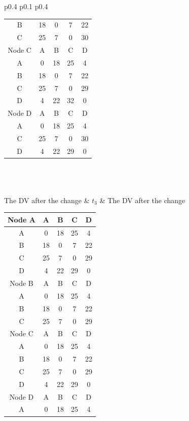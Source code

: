 \documentclass{article}
\begin{document}
\begin{tabular}{p{0.4\linewidth} p{0.1\linewidth} p{0.4\linewidth}}
\begin{tabular}{c|c|c|c|c}
        B & 18 & 0 & 7 & 22 \\
        C & 25 & 7 & 0 & 30 \\
        \hline
        \hline
        Node C & A & B & C & D \\
        \hline
        A & 0 & 18 & 25 & 4 \\
        B & 18 & 0 & 7 & 22 \\
        C & 25 & 7 & 0 & \color{red}29 \\
        D & 4 & 22 & 32 & 0 \\
        \hline
        \hline
        Node D & A & B & C & D \\
        \hline
        A & 0 & 18 & 25 & 4 \\
        C & 25 & 7 & 0 & 30 \\
        D & 4 & 22 & \color{red}29 & 0 \\
        \hline
    \end{tabular} \\ \\ \\ 
    The DV after the change & $t_3$ & The DV after the change \\
    \begin{tabular}{c|c|c|c|c}
        \hline
        Node A & A & B & C & D \\
        \hline
        A & 0 & 18 & 25 & 4 \\
        B & 18 & 0 & 7 & 22 \\
        C & 25 & 7 & 0 & \color{red}29 \\
        D & 4 & 22 & \color{red}29 & 0 \\
        \hline
        \hline
        Node B & A & B & C & D \\
        \hline 
        A & 0 & 18 & 25 & 4 \\
        B & 18 & 0 & 7 & 22 \\
        C & 25 & 7 & 0 & \color{red}29 \\
        \hline
        \hline
        Node C & A & B & C & D \\
        \hline
        A & 0 & 18 & 25 & 4 \\
        B & 18 & 0 & 7 & 22 \\
        C & 25 & 7 & 0 & \color{red}29 \\
        D & 4 & 22 & \color{red}29 & 0 \\
        \hline
        \hline
        Node D & A & B & C & D \\
        \hline
        A & 0 & 18 & 25 & 4 \\

\end{tabular}
\end{tabular}
\end{document}
